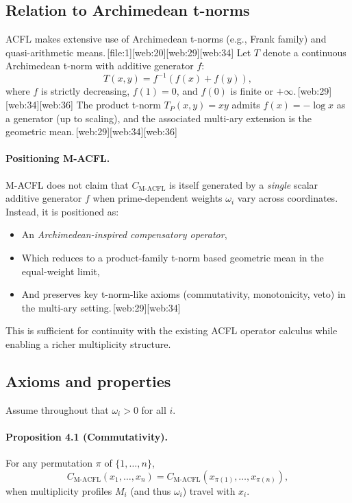 \documentclass[11pt]{article}
\begin{document}
\subsection{Relation to Archimedean t-norms}

ACFL makes extensive use of Archimedean t-norms (e.g., Frank family) and quasi-arithmetic means.\,[file:1][web:20][web:29][web:34] 
Let $T$ denote a continuous Archimedean t-norm with additive generator $f$:
\[
T(x,y) = f^{-1}(f(x)+f(y)),
\]
where $f$ is strictly decreasing, $f(1)=0$, and $f(0)$ is finite or $+\infty$.\,[web:29][web:34][web:36] 
The product t-norm $T_P(x,y)=xy$ admits $f(x)=-\log x$ as a generator (up to scaling), and the associated multi-ary extension is the geometric mean.\,[web:29][web:34][web:36] 

\paragraph{Positioning M-ACFL.}
M-ACFL does not claim that $C_{\text{M-ACFL}}$ is itself generated by a \emph{single} scalar additive generator $f$ when prime-dependent weights $\omega_i$ vary across coordinates. 
Instead, it is positioned as:
\begin{itemize}
  \item An \emph{Archimedean-inspired compensatory operator}, 
  \item Which reduces to a product-family t-norm based geometric mean in the equal-weight limit,
  \item And preserves key t-norm-like axioms (commutativity, monotonicity, veto) in the multi-ary setting.\,[web:29][web:34]
\end{itemize}
This is sufficient for continuity with the existing ACFL operator calculus while enabling a richer multiplicity structure.

\subsection{Axioms and properties}

Assume throughout that $\omega_i>0$ for all $i$.

\paragraph{Proposition 4.1 (Commutativity).}
For any permutation $\pi$ of $\{1,\dots,n\}$,
\[
C_{\text{M-ACFL}}(x_1,\dots,x_n) = C_{\text{M-ACFL}}(x_{\pi(1)},\dots,x_{\pi(n)}),
\]
when multiplicity profiles $M_i$ (and thus $\omega_i$) travel with $x_i$.
\end{document}
